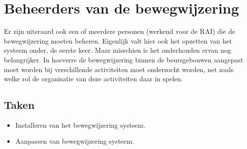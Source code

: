 \section{Beheerders van de bewegwijzering}

Er zijn uiteraard ook een of meerdere personen (werkend voor de RAI) die de bewegwijzering moeten beheren. Eigenlijk valt hier ook het opzetten van het systeem onder, de eerste keer. Maar misschien is het onderhouden ervan nog belangrijker. In hoeverre de bewegwijzering binnen de beursgebouwen aangepast moet worden bij verschillende activiteiten moet onderzocht worden, net zoals welke rol de organisatie van deze activiteiten daar in spelen.

\subsection*{Taken}

\begin{itemize}
\item Installeren van het bewegwijzering systeem.
\item Aanpassen van bewegwijzering systeem.
\end{itemize}
